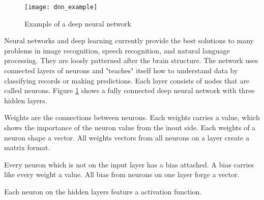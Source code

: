 \begin{figure}[H]
    \centering
    \texttt{[image: dnn\_example]}
    \caption{\cite{dnn_example_image} Example of a deep neural network}
    \label{fig:dnn_example}
\end{figure}

Neural networks and deep learning currently provide the best solutions to many problems in image recognition, speech recognition, and natural language processing.
\cite{nielsen-book}
They are loosly patterned after the brain structure.
The network uses connected layers of neurons and "teaches" itself how to understand data by classifying records or making predictions.
\cite{ibm-watson-healthcare}
Each layer consists of nodes that are called neurons.
Figure \ref{fig:dnn_example} shows a fully connected deep neural network with three hidden layers.

Weights are the connections between neurons.
Each weights carries a value, which shows the importance of the neuron value from the inout side.
Each weights of a neuron shape a vector.
All weights vectors from all neurons on a layer create a matrix format.

Every neuron which is not on the input layer has a bias attached.
A bias carries like every weight a value.
All bias from neurons on one layer forge a vector.

Each neuron on the hidden layers feature a activation function.

